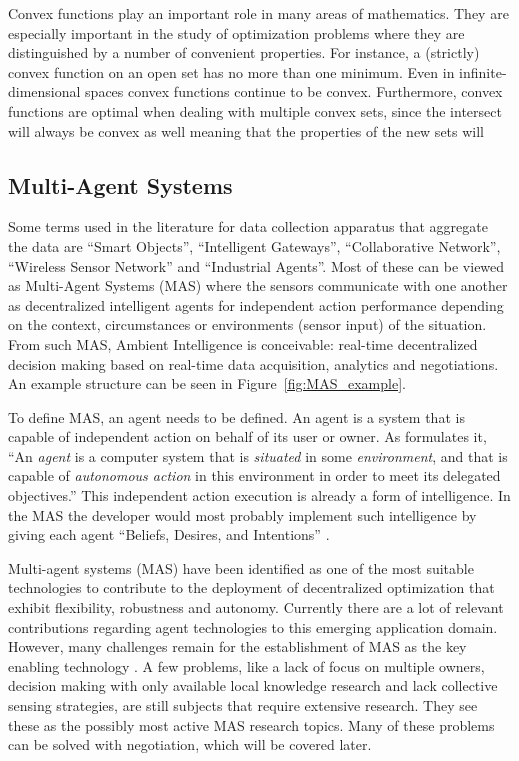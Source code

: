 Convex functions play an important role in many areas of mathematics. They are especially important in the study of optimization problems where they are distinguished by a number of convenient properties. For instance, a (strictly) convex function on an open set has no more than one minimum. Even in infinite-dimensional spaces convex functions continue to be convex. Furthermore, convex functions are optimal when dealing with multiple convex sets, since the intersect will always be convex as well meaning that the properties of the new sets will 
\subsection{Multi-Agent Systems}

Some terms used in the literature for data collection apparatus that aggregate the data are ``Smart Objects'', ``Intelligent Gateways'', ``Collaborative Network'', ``Wireless Sensor Network'' and ``Industrial Agents''. Most of these can be viewed as Multi-Agent Systems (MAS) where the sensors communicate with one another as decentralized intelligent agents for independent action performance depending on the context, circumstances or environments (sensor input) of the situation. From such MAS, Ambient Intelligence  is conceivable: real-time decentralized decision making based on real-time data acquisition, analytics and negotiations. An example structure can be seen in Figure~\ref{fig:MAS_example}.

To define MAS, an agent needs to be defined. An agent is a system that is capable of independent action on behalf of its user or owner. As  \citet{wooldridge2009introduction} formulates it, ``An \textit{agent} is a computer system that is \textit{situated} in some \textit{environment}, and that is capable of \textit{autonomous action} in this environment in order to meet its delegated objectives.'' This independent action execution is already a form of intelligence\citep{wooldridge2009introduction}. In the MAS the developer would most probably implement such intelligence by giving each agent ``Beliefs, Desires, and Intentions'' \citep{rao1995bdi}.  

Multi-agent systems (MAS) have been identified as one of the most suitable technologies to contribute to the deployment of decentralized optimization that exhibit flexibility, robustness and autonomy\citep{vinyals2010survey}. Currently there are a lot of relevant contributions regarding agent technologies to this emerging application domain. However, many challenges remain for the establishment of MAS as the key enabling technology \citep{vinyals2010survey}. A few problems, like a lack of focus on multiple owners, decision making with only available local knowledge research and lack collective sensing strategies, are still subjects that require extensive research. They see these as the possibly most active MAS research topics. Many of these problems can be solved with negotiation, which will be covered later.

